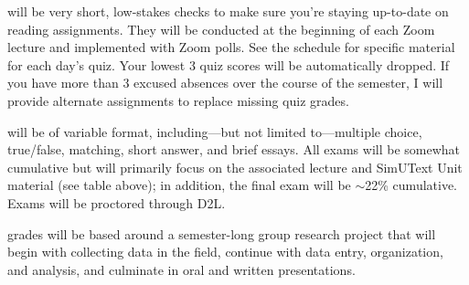 \documentclass{tufte-handout}
\begin{document}
\begin{fullwidth}

 will be very short, low-stakes checks to make sure you're staying up-to-date on reading assignments. They will be conducted at the beginning of each Zoom lecture and implemented with Zoom polls. See the schedule for specific material for each day's quiz. Your lowest 3 quiz scores will be automatically dropped. If you have more than 3 excused absences over the course of the semester, I will provide alternate assignments to replace missing quiz grades.

 will be of variable format, including---but not limited to---multiple choice, true/false, matching, short answer, and brief essays. All exams will be somewhat cumulative but will primarily focus on the associated lecture and SimUText Unit material (see table above); in addition, the final exam will be $\sim$22\% cumulative. Exams will be proctored through D2L.



 grades will be based around a semester-long group research project that will begin with collecting data in the field, continue with data entry, organization, and analysis, and culminate in oral and written presentations. 


\end{fullwidth}
\end{document}
